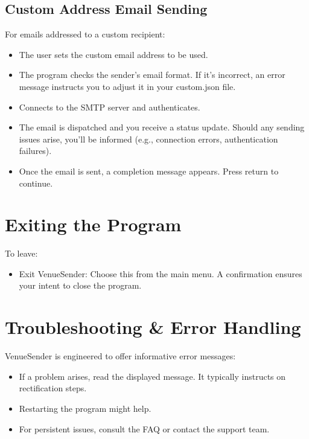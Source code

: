 \documentclass{article}
\begin{document}
	\subsection*{Custom Address Email Sending}
	For emails addressed to a custom recipient:
	\begin{itemize}
		\item The user sets the custom email address to be used.
		\item The program checks the sender's email format. If it's incorrect, an error message instructs you to adjust it in your custom.json file.
		\item Connects to the SMTP server and authenticates.
		\item The email is dispatched and you receive a status update. Should any sending issues arise, you'll be informed (e.g., connection errors, authentication failures).
		\item Once the email is sent, a completion message appears. Press return to continue.
	\end{itemize}
	
	\section*{Exiting the Program}
	To leave:
	\begin{itemize}
		\item Exit VenueSender: Choose this from the main menu. A confirmation ensures your intent to close the program.
	\end{itemize}
	
	\section*{Troubleshooting \& Error Handling}
	VenueSender is engineered to offer informative error messages:
	\begin{itemize}
		\item If a problem arises, read the displayed message. It typically instructs on rectification steps.
		\item Restarting the program might help.
		\item For persistent issues, consult the FAQ or contact the support team.
	\end{itemize}
	
\end{document}
